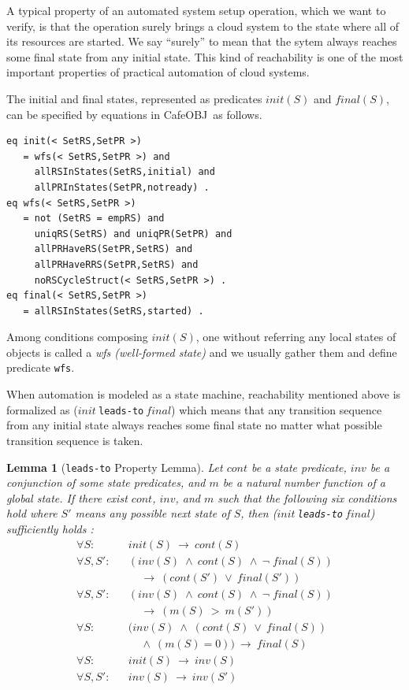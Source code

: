 \documentclass[12pt]{report}
\newtheorem{lemma}{Lemma}
\newcommand{\ra}{\rightarrow}
\newcommand{\stt}[1]{{\small{\tt {#1}}}}
\newcommand{\cafeobj}{{\sf CafeOBJ}~}
\begin{document}
A typical property of an automated system setup operation, which we
want to verify, is that the operation surely brings a cloud system to
the state where all of its resources are started.  We say ``surely''
to mean that the sytem always reaches some final state from any
initial state.  This kind of reachability is one of the most important
properties of practical automation of cloud systems.

The initial and final states, represented as predicates $init(S)$
and $final(S)$, can be specified by equations in \cafeobj as
follows.
\begin{verbatim}
eq init(< SetRS,SetPR >)
   = wfs(< SetRS,SetPR >) and
     allRSInStates(SetRS,initial) and 
     allPRInStates(SetPR,notready) .
eq wfs(< SetRS,SetPR >)
   = not (SetRS = empRS) and 
     uniqRS(SetRS) and uniqPR(SetPR) and 
     allPRHaveRS(SetPR,SetRS) and 
     allPRHaveRRS(SetPR,SetRS) and
     noRSCycleStruct(< SetRS,SetPR >) .
eq final(< SetRS,SetPR >)
   = allRSInStates(SetRS,started) .
\end{verbatim}
Among conditions composing $init(S)$, one without referring any local
states of objects is called a {\it wfs (well-formed state)} and we
usually gather them and define predicate {\tt wfs}.

When automation is modeled as a state machine, reachability mentioned
above is formalized as ($init~$\stt{leads-to}$~final$) which means
that any transition sequence from any initial state always reaches
some final state no matter what possible transition sequence is taken.
\begin{lemma}[\stt{leads-to} Property Lemma]
Let $cont$ be a state predicate, $inv$ be a conjunction of some state
predicates, and $m$ be a natural number function of a global state. If
there exist $cont$, $inv$, and $m$ such that the following six
conditions hold where $S'$ means any possible next state of $S$, then
($init~$\stt{leads-to}$~final$) sufficiently holds \cite{Futatsugi15}:
\begin{eqnarray}
\label{exp:cond1}
\forall S:&&init(S)\:\ra\: cont(S)\\
\label{exp:cond2}
\forall S,S':&&(inv(S)\;\land \:cont(S)\;\land \:\neg\;final(S))
\nonumber \\
 &&\:\:\:\:\:\ra\:(cont(S')\:\lor \:final(S'))\\
\label{exp:cond3}
\forall S,S':&&(inv(S)\;\land \:cont(S)\;\land \:\neg\;final(S))
\nonumber \\
 &&\:\:\:\:\:\ra\:(m(S)\: > \:m(S'))\\
\label{exp:cond4}
\forall S:&&(inv(S)\;\land\; (cont(S)\:\lor \:final(S))
\nonumber \\
 &&\:\:\:\:\:\land\:(m(S) = 0)) \:\ra\:final(S)\\
\label{exp:cond5}
\forall S:&&init(S)\:\ra\: inv(S)\\
\label{exp:cond6}
\forall S,S':&&inv(S)\:\ra\: inv(S')
\end{eqnarray}
\end{lemma}
\end{document}

